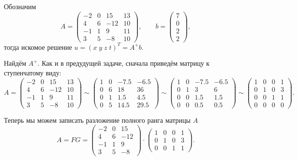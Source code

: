 Обозначим
\begin{equation*}
    A =
    \begin{pmatrix}
        -2 & 0 & 15 & 13\\
        4 & 6 & -12 & 10\\
        -1 & 1 & 9 & 11\\
        3 & 5 & -8 & 10
    \end{pmatrix}
    ,\qquad
    b =
    \begin{pmatrix}
        7\\
        0\\
        2\\
        2
    \end{pmatrix},
\end{equation*}
тогда искомое решение $u = (x\; y\; z\; t)^T = A^+ b$.

Найдём $A^+$. Как и в предудущей задаче, сначала приведём матрицу к
ступенчатому виду:
\begin{equation*}
    A =
    \begin{pmatrix}
        -2 & 0 & 15 & 13\\
        4 & 6 & -12 & 10\\
        -1 & 1 & 9 & 11\\
        3 & 5 & -8 & 10
    \end{pmatrix}
    \sim
    \begin{pmatrix}
        1 & 0 & -7.5 & -6.5\\
        0 & 6 & 18 & 36\\
        0 & 1 & 1.5 & 4.5\\
        0 & 5 & 14.5 & 29.5
    \end{pmatrix}
    \sim
    \begin{pmatrix}
        1 & 0 & -7.5 & -6.5\\
        0 & 1 & 3 & 6\\
        0 & 0 & 1.5 & 1.5\\
        0 & 0 & 0.5 & 0.5
    \end{pmatrix}
    \sim
    \begin{pmatrix}
        1 & 0 & 0 & 1\\
        0 & 1 & 0 & 3\\
        0 & 0 & 1 & 1\\
        0 & 0 & 0 & 0
    \end{pmatrix}.
\end{equation*}

Теперь мы можем записать разложение полного ранга матрицы $A$
\begin{equation*}
    A = FG =
    \begin{pmatrix}
        -2 & 0 & 15\\
        4 & 6 & -12\\
        -1 & 1 & 9\\
        3 & 5 & -8
    \end{pmatrix}
    \cdot
    \begin{pmatrix}
        1 & 0 & 0 & 1\\
        0 & 1 & 0 & 3\\
        0 & 0 & 1 & 1
    \end{pmatrix}.
\end{equation*}

